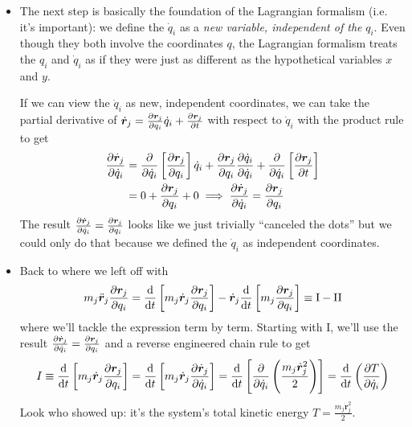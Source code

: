 \documentclass[11pt, a4paper]{article}
\newcommand{\bdot}[1]{\dot{\bm{#1}}} %
\newcommand{\bddot}[1]{\ddot{\bm{#1}}} %
\begin{document}
\begin{itemize}
	\item The next step is basically the foundation of the Lagrangian formalism (i.e. it's important): we define the $ \dot{q}_{i} $ as a \textit{new variable, independent of the} $ q_{i} $. Even though they both involve the coordinates $ q $, the Lagrangian formalism treats the $ q_{i} $ and $ \dot{q}_{i} $ as if they were just as different as the hypothetical variables $ x $ and $ y $. 
	
	If we can view the $ \dot{q}_{i} $ as new, independent coordinates, we can take the partial derivative of  $ \bdot{r}_{j} = \pdv{\bm{r}_{j}}{q_{i}} \dot{q}_{i} + \pdv{\bm{r}_{j}}{t} $ with respect to $ \dot{q}_{i} $ with the product rule to get
	\begin{align*}
		\pdv{\bdot{r}_{j}}{\dot{q}_{i}} &= \pdv{}{\dot{q}_{i}} \left[\pdv{\bm{r}_{j}}{q_{i}}\right] \dot{q}_{i} + \pdv{\bm{r}_{j}}{q_{i}} \pdv{\dot{q}_{i}}{\dot{q}_{i}} + \pdv{}{\dot{q}_{i}} \left[ \pdv{\bm{r}_{j}}{t}\right] \\
		&= 0 +  \pdv{\bm{r}_{j}}{q_{i}} + 0 \implies \pdv{\bdot{r}_{j}}{\dot{q}_{i}} = \pdv{\bm{r}_{j}}{q_{i}}
	\end{align*}
	The result $ \pdv{\bdot{r}_{j}}{\dot{q}_{i}} = \pdv{\bm{r}_{j}}{q_{i}} $ looks like we just trivially ``canceled the dots'' but we could only do that because we defined the $ \dot{q}_{i} $  as independent coordinates.
	
	\item Back to where we left off with
	\begin{equation*}
		m_{j}\bddot{\bm{r}}_{j} \pdv{\bm{r}_{j}}{q_{i}} = \dv{}{t}\left[m_{j}\bdot{r}_{j}  \pdv{\bm{r}_{j}}{q_{i}} \right] - \bdot{r}_{j} \dv{}{t}\left[m_{j}\pdv{\bm{r}_{j}}{q_{i}} \right] \equiv \mathrm{I} - \mathrm{II}
	\end{equation*}
	where we'll tackle the expression term by term. Starting with I, we'll use the result $ \pdv{\bdot{r}_{j}}{\dot{q}_{i}} = \pdv{\bm{r}_{j}}{q_{i}} $ and a reverse engineered chain rule to get
	\begin{equation*}
		I \equiv \dv{}{t}\left[m_{j} \bdot{r}_{j}  \pdv{\bm{r}_{j}}{q_{i}} \right] =  \dv{}{t}\left[m_{j} \bdot{r}_{j}  \pdv{\bdot{r}_{j}}{\dot{q}_{i}} \right] = \dv{}{t} \left[\pdv{}{\dot{q}_{i}}  \left(\frac{m_{j} \bdot{r}_{j}^{2}}{2}\right)\right] = \dv{}{t} \left(\pdv{T}{\dot{q}_{i}}\right)
	\end{equation*}
	Look who showed up: it's the system's total kinetic energy $ T =\frac{ m_{j} \bdot{r}_{j}^{2}}{2} $.
	

\end{itemize}
\end{document}
